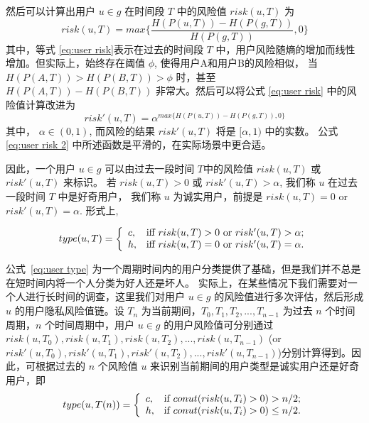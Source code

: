 然后可以计算出用户 $u \in g$ 在时间段 $T$ 中的风险值 $risk(u,T)$ 为
\begin{equation}\label{eq:user risk}
risk(u,T)=max \{\frac{H(P(u,T))-H(P(g,T))}{H(P(g,T))},0\}
\end{equation}
其中，等式 \ref{eq:user risk}表示在过去的时间段 $T$ 中，用户风险随熵的增加而线性增加。但实际上，始终存在阈值 $\phi$, 使得用户A和用户B的风险相似， 当 $H(P(A,T))>H(P(B,T))>\phi$ 时，甚至 $H(P(A,T))-H(P(B,T))$ 非常大。然后可以将公式 \ref{eq:user risk} 中的风险值计算改进为
\begin{equation}\label{eq:user risk 2}
risk'(u,T)=\alpha ^ {max \{H(P(u,T))-H(P(g,T)),0\}}
\end{equation}
其中， $\alpha \in (0,1)$, 而风险的结果 $risk'(u,T)$ 将是 $[\alpha, 1)$ 中的实数。 公式\ref{eq:user risk 2} 中所述函数是平滑的，在实际场景中更合适。

因此，一个用户 $u \in g$ 可以由过去一段时间 $T$中的风险值 $risk(u,T)$ 或 $risk'(u,T)$ 来标识。 若 $risk(u,T) > 0$ 或 $risk'(u,T)>\alpha$, 我们称 $u$ 在过去一段时间 $T$ 中是好奇用户， 我们称 $u$ 为诚实用户，前提是  $risk(u,T) = 0$ or $risk'(u,T)=\alpha$. 形式上,

\begin{equation}\label{eq:user type}
type(u,T)=
\left\{
\begin{array}{ll}
c, & \hbox{iff $risk(u,T) > 0$ or $risk'(u,T)>\alpha$;} \\
h, & \hbox{iff  $risk(u,T) = 0$ or $risk'(u,T)=\alpha$.} \\
\end{array}
\right.
\end{equation}

公式~\ref{eq:user type} 为一个周期时间内的用户分类提供了基础，但是我们并不总是在短时间内将一个人分类为好人还是坏人。 实际上，在某些情况下我们需要对一个人进行长时间的调查，这里我们对用户 $u \in g$ 的风险值进行多次评估，然后形成 $u$ 的用户隐私风险值链。设 $T_n$ 为当前期间，$T_0, T_1, T_2, ..., T_{n-1}$ 为过去 $n$ 个时间周期，$n$ 个时间周期中，用户 $u \in g$ 的用户风险值可分别通过 $risk(u,T_0),risk(u,T_1),risk(u,T_2),..., risk(u,T_{n-1})$ (or $risk'(u,T_0), risk'(u,T_1), risk'(u,T_2), ..., risk'(u,T_{n-1})$)分别计算得到。因此，可根据过去的 $n$ 个风险值 $u$ 来识别当前期间的用户类型是诚实用户还是好奇用户，即
\begin{equation}\label{eq:user type Tn 1}
type(u,T(n))=
\left\{
\begin{array}{ll}
c, & \hbox{if $conut(risk(u,T_i) > 0) > n/2$;} \\
h, & \hbox{if $conut(risk(u,T_i) > 0) \leq n/2$.} \\
\end{array}
\right.
\end{equation}

